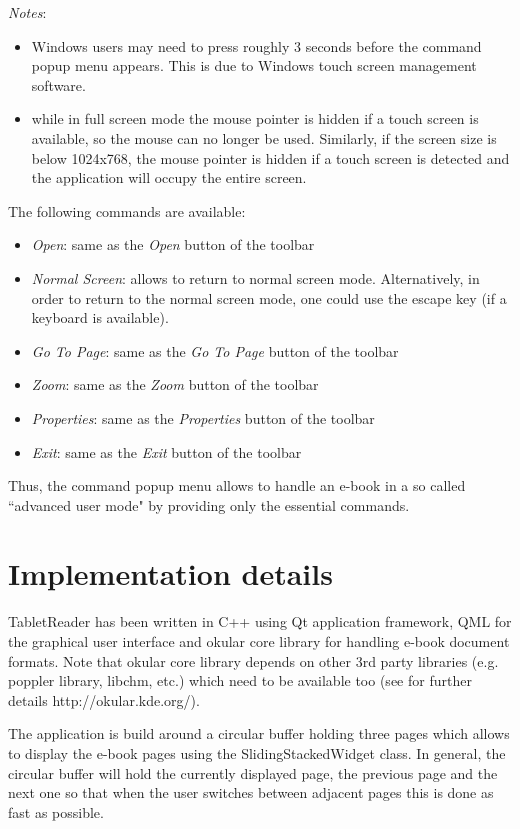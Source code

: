 \documentclass[journal,12pt]{IEEEtran}
\begin{document}
\textit{Notes}: 
\begin{itemize}
 \item Windows users may need to press roughly 3 seconds before the command popup menu appears. This is due to Windows touch screen management software.
 \item while in full screen mode the mouse pointer is hidden if a touch screen is available, so the mouse can no longer be used. Similarly, if the screen size is below 1024x768, the mouse pointer is hidden if a touch screen is detected and the application will occupy the entire screen.
\end{itemize}

The following commands are available:
\begin{itemize}
 \item \textit{Open}: same as the \textit{Open} button of the toolbar
\item \textit{Normal Screen}: allows to return to normal screen mode. Alternatively, in order to return to the normal screen mode, one could use the escape key (if a keyboard is available).
 \item \textit{Go To Page}: same as the \textit{Go To Page} button of the toolbar
 \item \textit{Zoom}: same as the \textit{Zoom} button of the toolbar
 \item \textit{Properties}: same as the \textit{Properties} button of the toolbar
 \item \textit{Exit}: same as the \textit{Exit} button of the toolbar
\end{itemize}
Thus, the command popup menu allows to handle an e-book in a so called ``advanced user mode" by providing only the essential commands.

\section{Implementation details}
TabletReader has been written in C++ using Qt application framework, QML for the graphical user interface and okular core library for handling e-book document formats. Note that okular core library depends on other 3rd party libraries (e.g. poppler library, libchm, etc.) which need to be available too (see for further details http://okular.kde.org/).

The application is build around a circular buffer holding three pages which allows to display the e-book pages using the \textrm{SlidingStackedWidget} class. In general, the circular buffer will hold the currently displayed page, the previous page and the next one so that when the user switches between adjacent pages this is done as fast as possible. 
\end{document}
